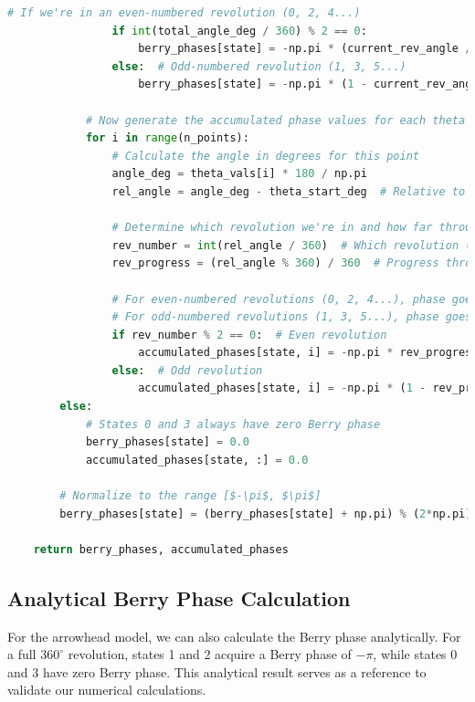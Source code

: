 \documentclass[12pt,a4paper]{article}
\begin{document}
\begin{lstlisting}[language=Python, caption=Numerical Berry Phase Calculation]
                # If we're in an even-numbered revolution (0, 2, 4...)
                if int(total_angle_deg / 360) % 2 == 0:
                    berry_phases[state] = -np.pi * (current_rev_angle / 360)
                else:  # Odd-numbered revolution (1, 3, 5...)
                    berry_phases[state] = -np.pi * (1 - current_rev_angle / 360)
            
            # Now generate the accumulated phase values for each theta point
            for i in range(n_points):
                # Calculate the angle in degrees for this point
                angle_deg = theta_vals[i] * 180 / np.pi
                rel_angle = angle_deg - theta_start_deg  # Relative to start
                
                # Determine which revolution we're in and how far through it
                rev_number = int(rel_angle / 360)  # Which revolution (0-indexed)
                rev_progress = (rel_angle % 360) / 360  # Progress through current revolution (0 to 1)
                
                # For even-numbered revolutions (0, 2, 4...), phase goes from 0 to $-\pi$
                # For odd-numbered revolutions (1, 3, 5...), phase goes from -pi to 0
                if rev_number % 2 == 0:  # Even revolution
                    accumulated_phases[state, i] = -np.pi * rev_progress
                else:  # Odd revolution
                    accumulated_phases[state, i] = -np.pi * (1 - rev_progress)
        else:
            # States 0 and 3 always have zero Berry phase
            berry_phases[state] = 0.0
            accumulated_phases[state, :] = 0.0
        
        # Normalize to the range [$-\pi$, $\pi$]
        berry_phases[state] = (berry_phases[state] + np.pi) % (2*np.pi) - np.pi
    
    return berry_phases, accumulated_phases
\end{lstlisting}

\subsection{Analytical Berry Phase Calculation}

For the arrowhead model, we can also calculate the Berry phase analytically. For a full $360^\circ$ revolution, states 1 and 2 acquire a Berry phase of $-\pi$, while states 0 and 3 have zero Berry phase. This analytical result serves as a reference to validate our numerical calculations.
\end{document}

